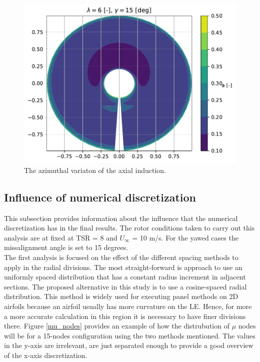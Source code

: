 \begin{figure}[htbp]
	\centering
	\includegraphics[height=0.45\textheight]{./img/yaw/contour-n_az-51.pdf}
	\caption{The azimuthal variaton of the axial induction.}
	\label{img:contour}
\end{figure}



\subsection{\textbf{Influence of numerical discretization} }

This subsection provides information about the influence that the numerical discretization has in the final results. The rotor conditions taken to carry out this analysis are at fixed at TSR = 8 and $U_{\infty} $ = 10 m/s. For the yawed cases the missalignment angle is set to 15 degrees. \\

The first analysis is focused on the effect of the different spacing methods to apply in the radial divisions. The most straight-forward is approach to use an uniformly spaced distribution that has a constant radius increment in adjacent sections. The proposed alternative in this study is to use a cosine-spaced radial distribution. This method is widely used for executing panel methods on 2D airfoils because an airfoil usually has more curvature on the LE. Hence, for more a more accurate calculation in this region it is necessary to have finer divisions there. Figure \ref{mu_nodes} provides an example of how the distrubution of $\mu$ nodes will be for a 15-nodes configuration using the two methods mentioned. The values in the y-axis are irrelevant, are just separated enough to provide a good overview of the x-axis discretization. 

